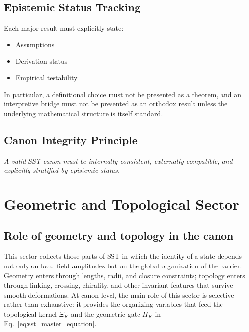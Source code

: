 \documentclass[11pt]{article}
\theoremstyle{definition}
\theoremstyle{plain}
\theoremstyle{remark}
\begin{document}
    \subsection{Epistemic Status Tracking}
        
        Each major result must explicitly state:
        
        \begin{itemize}
            \item Assumptions
            \item Derivation status
            \item Empirical testability
        \end{itemize}

        In particular, a definitional choice must not be presented as a theorem, and an interpretive bridge must not be presented as an orthodox result unless the underlying mathematical structure is itself standard.
    
    \subsection{Canon Integrity Principle}
        
        \begin{center}
            \textit{A valid SST canon must be internally consistent, externally compatible, and explicitly stratified by epistemic status.}
        \end{center}

    \section{Geometric and Topological Sector}
        \label{sec:geometry}

    \subsection{Role of geometry and topology in the canon}
        This sector collects those parts of SST in which the identity of a state depends not only on local field amplitudes but on the global organization of the carrier. Geometry enters through lengths, radii, and closure constraints; topology enters through linking, crossing, chirality, and other invariant features that survive smooth deformations. At canon level, the main role of this sector is selective rather than exhaustive: it provides the organizing variables that feed the topological kernel $\Xi_K$ and the geometric gate $\Pi_K$ in Eq.~\eqref{eq:sst_master_equation}.
\end{document}
